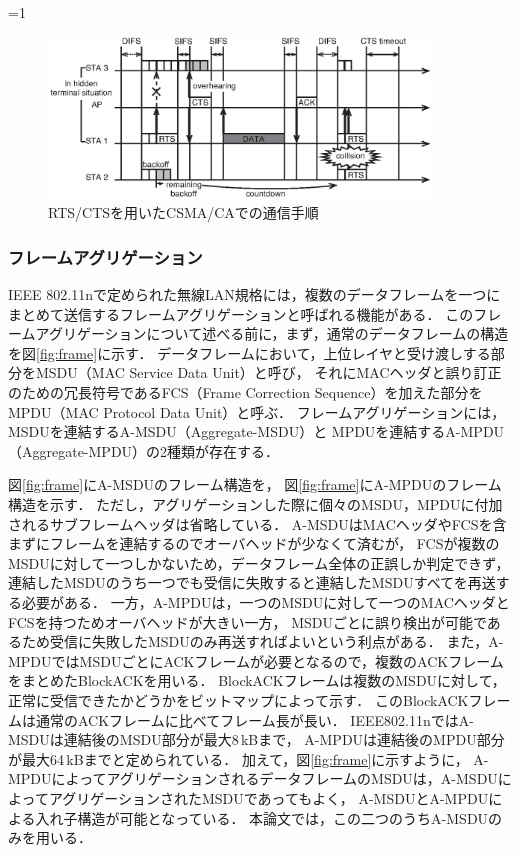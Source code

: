 \documentclass[master]{kuisthesis}		%
\newcounter{flagFig}
\begin{document}
			\ifnum\value{flagFig}=1 {\begin{figure}[htbp]
				\begin{center}
					\includegraphics[width=0.9\textwidth]{fig/rtscts2.eps}
					\caption{RTS/CTSを用いたCSMA/CAでの通信手順}
					\label{fig:rtscts}
				\end{center}
			\end{figure}}\fi

		\subsubsection{フレームアグリゲーション}
			{IEEE} 802.11nで定められた無線LAN規格には，複数のデータフレームを一つにまとめて送信するフレームアグリゲーションと呼ばれる機能がある\cite{stdn}．
			このフレームアグリゲーションについて述べる前に，まず，通常のデータフレームの構造を図\ref{fig:frame}に示す．
			データフレームにおいて，上位レイヤと受け渡しする部分をMSDU（MAC Service Data Unit）と呼び，
			それにMACヘッダと誤り訂正のための冗長符号であるFCS（Frame Correction Sequence）を加えた部分をMPDU（MAC Protocol Data Unit）と呼ぶ．
			フレームアグリゲーションには，MSDUを連結するA-MSDU（Aggregate-MSDU）と
			MPDUを連結するA-MPDU（Aggregate-MPDU）の2種類が存在する．

			\par
			図\ref{fig:frame}にA-MSDUのフレーム構造を，
			図\ref{fig:frame}にA-MPDUのフレーム構造を示す．
			ただし，アグリゲーションした際に個々のMSDU，MPDUに付加されるサブフレームヘッダは省略している．
			A-MSDUはMACヘッダやFCSを含まずにフレームを連結するのでオーバヘッドが少なくて済むが，
			FCSが複数のMSDUに対して一つしかないため，データフレーム全体の正誤しか判定できず，
			連結したMSDUのうち一つでも受信に失敗すると連結したMSDUすべてを再送する必要がある．
			一方，A-MPDUは，一つのMSDUに対して一つのMACヘッダとFCSを持つためオーバヘッドが大きい一方，
			MSDUごとに誤り検出が可能であるため受信に失敗したMSDUのみ再送すればよいという利点がある．
			また，A-MPDUではMSDUごとにACKフレームが必要となるので，複数のACKフレームをまとめたBlockACKを用いる．
			BlockACKフレームは複数のMSDUに対して，正常に受信できたかどうかをビットマップによって示す．
			このBlockACKフレームは通常のACKフレームに比べてフレーム長が長い．
			IEEE802.11nではA-MSDUは連結後のMSDU部分が最大8\,kBまで，
			A-MPDUは連結後のMPDU部分が最大64\,kBまでと定められている\cite{stdn}．
			加えて，図\ref{fig:frame}に示すように，
			A-MPDUによってアグリゲーションされるデータフレームのMSDUは，A-MSDUによってアグリゲーションされたMSDUであってもよく，
			A-MSDUとA-MPDUによる入れ子構造が可能となっている．
			本論文では，この二つのうちA-MSDUのみを用いる．
\end{document}
